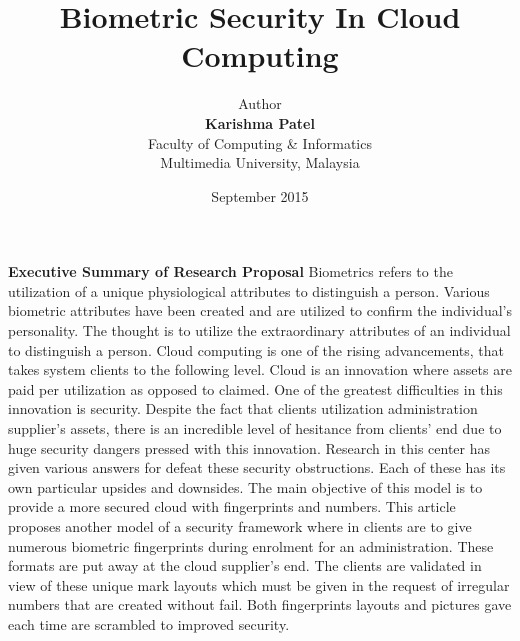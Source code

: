 \documentclass[12pt]{article}
\title{\textbf{Biometric Security In Cloud Computing}}
\date{September 2015}
\author{
Author\\
\textbf{Karishma Patel}\\
Faculty of Computing \& Informatics\\
Multimedia University, Malaysia}
\begin{document}
\begin{titlepage}
\maketitle
\end{titlepage}

\textbf{\large Executive Summary of Research Proposal} \newline \newline \newline
Biometrics refers to the utilization of a unique physiological attributes to distinguish a person. Various biometric attributes have been created and are utilized to confirm the individual's personality. The thought is to utilize the extraordinary attributes of an individual to distinguish a person. Cloud computing is one of the rising advancements, that takes system clients to the following level. Cloud is an innovation where assets are paid per utilization as opposed to claimed. One of the greatest difficulties in this innovation is security. Despite the fact that clients utilization administration supplier's assets, there is an incredible level of hesitance from clients' end due to huge security dangers pressed with this innovation. Research in this center has given various answers for defeat these security obstructions. Each of these has its own particular upsides and downsides. The main objective of this model is to provide a more secured cloud with fingerprints and numbers. This article proposes another model of a security framework where in clients are to give numerous biometric fingerprints during enrolment for an administration. These formats are put away at the cloud supplier's end. The clients are validated in view of these unique mark layouts which must be given in the request of irregular numbers that are created without fail. Both fingerprints layouts and pictures gave each time are scrambled to improved security. \newpage
\end{document}
